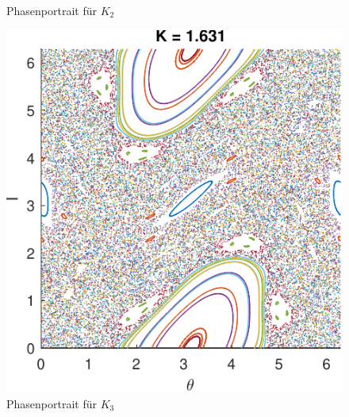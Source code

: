 \documentclass[paper=a4, 
                DIV=12]{scrartcl}
\begin{document}
\begin{figure}[H]
\begin{minipage}[t]{0.48\textwidth}
        \caption{Phasenportrait für $K_2$}
    \end{minipage}
    \par\vspace{1cm}
    \begin{minipage}[t]{0.48\textwidth}
        \centering
        \includegraphics[height=0.28\textheight]{figures/phasenportrait_k3.pdf}
        \caption{Phasenportrait für $K_3$}
    \end{minipage}
\end{figure}

\newpage
\end{document}

